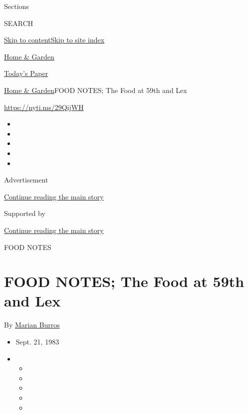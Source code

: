 Sections

SEARCH

\protect\hyperlink{site-content}{Skip to
content}\protect\hyperlink{site-index}{Skip to site index}

\href{https://www.nytimes3xbfgragh.onion/pages/garden/index.html}{Home
\& Garden}

\href{https://myaccount.nytimes3xbfgragh.onion/auth/login?response_type=cookie\&client_id=vi}{}

\href{https://www.nytimes3xbfgragh.onion/section/todayspaper}{Today's
Paper}

\href{/pages/garden/index.html}{Home \& Garden}\textbar{}FOOD NOTES; The
Food at 59th and Lex

\url{https://nyti.ms/29QijWH}

\begin{itemize}
\item
\item
\item
\item
\item
\end{itemize}

Advertisement

\protect\hyperlink{after-top}{Continue reading the main story}

Supported by

\protect\hyperlink{after-sponsor}{Continue reading the main story}

FOOD NOTES

\hypertarget{food-notes-the-food-at-59th-and-lex}{%
\section{FOOD NOTES; The Food at 59th and
Lex}\label{food-notes-the-food-at-59th-and-lex}}

By \href{https://www.nytimes3xbfgragh.onion/by/marian-burros}{Marian
Burros}

\begin{itemize}
\item
  Sept. 21, 1983
\item
  \begin{itemize}
  \item
  \item
  \item
  \item
  \item
  \end{itemize}
\end{itemize}

